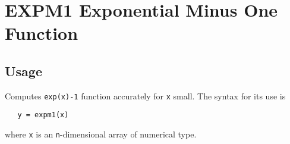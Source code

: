 \section{EXPM1 Exponential Minus One Function}

\subsection{Usage}

Computes \verb|exp(x)-1| function accurately for \verb|x|
small.  The syntax for its use is
\begin{verbatim}
   y = expm1(x)
\end{verbatim}
where \verb|x| is an \verb|n|-dimensional array of numerical type.
